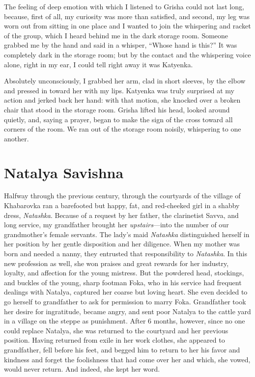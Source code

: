 The feeling of deep emotion with which I listened to Grisha could not last long, because, first of all, my curiosity was more than satisfied, and second, my leg was worn out from sitting in one place and I wanted to join the whispering and racket of the group, which I heard behind me in the dark storage room. Someone grabbed me by the hand and said in a whisper, ``Whose hand is this?'' It was completely dark in the storage room; but by the contact and the whispering voice alone, right in my ear, I could tell right away it was Katyenka.

Absolutely unconsciously, I grabbed her arm, clad in short sleeves, by the elbow and pressed in toward her with my lips. Katyenka was truly surprised at my action and jerked back her hand: with that motion, she knocked over a broken chair that stood in the storage room. Grisha lifted his head, looked around quietly, and, saying a prayer, began to make the sign of the cross toward all corners of the room. We ran out of the storage room noisily, whispering to one another.

\chapter{Natalya Savishna}

Halfway through the previous century, through the courtyards of the village of Khabarovka ran a barefooted but happy, fat, and red-cheeked girl in a shabby dress, \textit{Natashka}. Because of a request by her father, the clarinetist Savva, and long service, my grandfather brought her \emph{upstairs}---into the number of our grandmother's female servants. The lady's maid \textit{Natashka} distinguished herself in her position by her gentle disposition and her diligence. When my mother was born and needed a nanny, they entrusted that responsibility to \textit{Natashka}. In this new profession as well, she won praises and great rewards for her industry, loyalty, and affection for the young mistress. But the powdered head, stockings, and buckles of the young, sharp footman Foka, who in his service had frequent dealings with Natalya, captured her coarse but loving heart. She even decided to go herself to grandfather to ask for permission to marry Foka. Grandfather took her desire for ingratitude, became angry, and sent poor Natalya to the cattle yard in a village on the steppe as punishment. After 6 months, however, since no one could replace Natalya, she was returned to the courtyard and her previous position. Having returned from exile in her work clothes, she appeared to grandfather, fell before his feet, and begged him to return to her his favor and kindness and forget the foolishness that had come over her and which, she vowed, would never return. And indeed, she kept her word.


